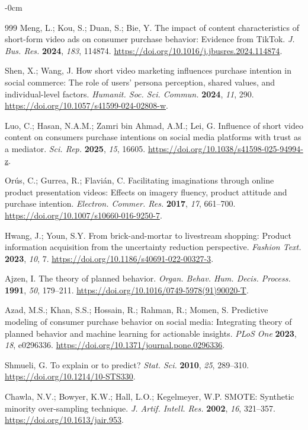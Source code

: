 \documentclass[jtaer,article,submit,moreauthors]{Definitions/mdpi}
\begin{document}
\begin{adjustwidth}{-\extralength}{0cm}
\begin{thebibliography}{999}
	Meng, L.; Kou, S.; Duan, S.; Bie, Y.
	The impact of content characteristics of short-form video ads on
	consumer purchase behavior: Evidence from TikTok.
	{\em J. Bus. Res.} {\bf 2024}, {\em 183}, 114874.
	\url{https://doi.org/10.1016/j.jbusres.2024.114874}.
	
	Shen, X.; Wang, J.
	How short video marketing influences purchase intention in social
	commerce: The role of users' persona perception, shared values, and
	individual-level factors.
	{\em Humanit. Soc. Sci. Commun.} {\bf 2024}, {\em 11}, 290.
	\url{https://doi.org/10.1057/s41599-024-02808-w}.
	
	Luo, C.; Hasan, N.A.M.; Zamri bin Ahmad, A.M.; Lei, G.
	Influence of short video content on consumers purchase intentions on
	social media platforms with trust as a mediator.
	{\em Sci. Rep.} {\bf 2025}, {\em 15}, 16605.
	\url{https://doi.org/10.1038/s41598-025-94994-z}.
	
	Orús, C.; Gurrea, R.; Flavián, C.
	Facilitating imaginations through online product presentation videos:
	Effects on imagery fluency, product attitude and purchase intention.
	{\em Electron. Commer. Res.} {\bf 2017}, {\em 17}, 661--700.
	\url{https://doi.org/10.1007/s10660-016-9250-7}.
	
	Hwang, J.; Youn, S.Y.
	From brick-and-mortar to livestream shopping: Product information
	acquisition from the uncertainty reduction perspective.
	{\em Fashion Text.} {\bf 2023}, {\em 10}, 7.
	\url{https://doi.org/10.1186/s40691-022-00327-3}.
	
	Ajzen, I.
	The theory of planned behavior.
	{\em Organ. Behav. Hum. Decis. Process.} {\bf 1991}, {\em 50},
	179--211.
	\url{https://doi.org/10.1016/0749-5978(91)90020-T}.
	
	Azad, M.S.; Khan, S.S.; Hossain, R.; Rahman, R.; Momen, S.
	Predictive modeling of consumer purchase behavior on social media:
	Integrating theory of planned behavior and machine learning for
	actionable insights.
	{\em PLoS One} {\bf 2023}, {\em 18}, e0296336.
	\url{https://doi.org/10.1371/journal.pone.0296336}.
	
	Shmueli, G.
	To explain or to predict?
	{\em Stat. Sci.} {\bf 2010}, {\em 25}, 289--310.
	\url{https://doi.org/10.1214/10-STS330}.
	
	Chawla, N.V.; Bowyer, K.W.; Hall, L.O.; Kegelmeyer, W.P.
	SMOTE: Synthetic minority over-sampling technique.
	{\em J. Artif. Intell. Res.} {\bf 2002}, {\em 16}, 321--357.
	\url{https://doi.org/10.1613/jair.953}.
	

\end{thebibliography}
\end{adjustwidth}
\end{document}
